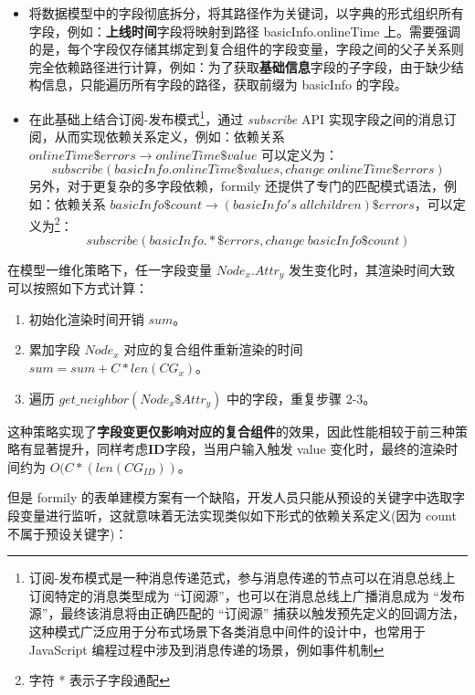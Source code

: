 \documentclass[winfonts,master,twoside]{njuthesis}
\begin{document}
\begin{itemize}
    \item 将数据模型中的字段彻底拆分，将其路径作为关键词，以字典的形式组织所有字段，例如：\textbf{上线时间}字段将映射到路径 basicInfo.onlineTime 上。需要强调的是，每个字段仅存储其绑定到复合组件的字段变量，字段之间的父子关系则完全依赖路径进行计算，例如：为了获取\textbf{基础信息}字段的子字段，由于缺少结构信息，只能遍历所有字段的路径，获取前缀为 basicInfo 的字段。
    \item 在此基础上结合订阅-发布模式\footnote{订阅-发布模式是一种消息传递范式，参与消息传递的节点可以在消息总线上订阅特定的消息类型成为 “订阅源”，也可以在消息总线上广播消息成为 “发布源”，最终该消息将由正确匹配的 “订阅源” 捕获以触发预先定义的回调方法，这种模式广泛应用于分布式场景下各类消息中间件的设计中\cite{banavar1999efficient}，也常用于 JavaScript 编程过程中涉及到消息传递的场景，例如事件机制\cite{osmani2012learning}}，通过 \textit{subscribe} API 实现字段之间的消息订阅，从而实现依赖关系定义，例如：依赖关系 $onlineTime\$errors \rightarrow onlineTime\$value$ 可以定义为：\\$$subscribe(basicInfo.onlineTime\$values, change\ onlineTime\$errors)$$另外，对于更复杂的多字段依赖，formily 还提供了专门的匹配模式语法，例如：依赖关系 $basicInfo\$count \rightarrow (basicInfo's\ all children)\$errors$，可以定义为\footnote{字符 * 表示子字段通配}：\\ $$subscribe(basicInfo.*\$errors,change\ basicInfo\$count)$$
\end{itemize}

在模型一维化策略下，任一字段变量 $Node_x.Attr_y$ 发生变化时，其渲染时间大致可以按照如下方式计算：

\begin{enumerate}
    \item 初始化渲染时间开销 $sum$。
    \item 累加字段 $Node_x$ 对应的复合组件重新渲染的时间 $sum=sum+C*len(CG_x)$。
    \item 遍历 $get\_neighbor(Node_x\$Attr_y)$ 中的字段，重复步骤 2-3。
\end{enumerate}

这种策略实现了\textbf{字段变更仅影响对应的复合组件}的效果，因此性能相较于前三种策略有显著提升，同样考虑\textbf{ID}字段，当用户输入触发 value 变化时，最终的渲染时间约为 $O(C*(len(CG_{ID}))$。

但是 formily 的表单建模方案有一个缺陷，开发人员只能从预设的关键字中选取字段变量进行监听，这就意味着无法实现类似如下形式的依赖关系定义(因为 count 不属于预设关键字)：
\end{document}
